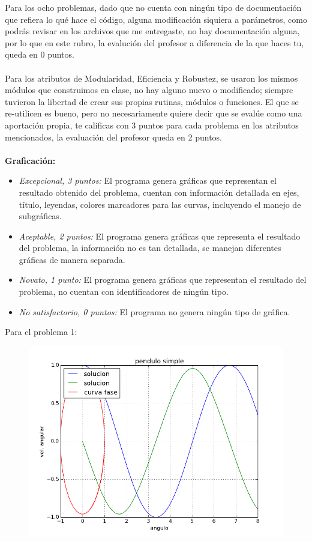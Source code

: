 \documentclass[letterpaper]{article}
\begin{document}
Para los ocho problemas, dado que no cuenta con ningún tipo de documentación que refiera lo qué hace el código, alguna modificación siquiera a parámetros, como podrás revisar en los archivos que me entregaste, no hay documentación alguna, por lo que en este rubro, la evalución del profesor a diferencia de la que haces tu, queda en 0 puntos.
\\
\\
Para los atributos de Modularidad, Eficiencia y Robustez, se usaron los mismos módulos que construimos en clase, no hay alguno nuevo o modificado; siempre tuvieron la libertad de crear sus propias rutinas, módulos o funciones. El que se re-utilicen es bueno, pero no necesariamente quiere decir que se evalúe como una aportación propia, te calificas con 3 puntos para cada problema en los atributos mencionados, la evaluación del profesor queda en 2 puntos.
\\
\\
\textbf{Graficación:}
\begin{itemize}
\item \emph{Excepcional, 3 puntos:} El programa genera gráficas que representan el resultado obtenido del problema, cuentan con información detallada en ejes, título, leyendas, colores marcadores para las curvas, incluyendo el manejo de subgráficas.
\item \emph{Aceptable, 2 puntos:} El programa genera gráficas que representa el resultado del problema, la información no es tan detallada, se manejan diferentes gráficas de manera separada.
\item \emph{Novato, 1 punto:} El programa genera gráficas que representan el resultado del problema, no cuentan con identificadores de ningún tipo.
\item \emph{No satisfactorio, 0 puntos:} El programa no genera ningún tipo de gráfica.
\end{itemize}
Para el problema 1:
\begin{figure}[H]
	\centering
	\includegraphics[scale=0.5]{Problema1_Ricardo.png} 
\end{figure}
\end{document}
